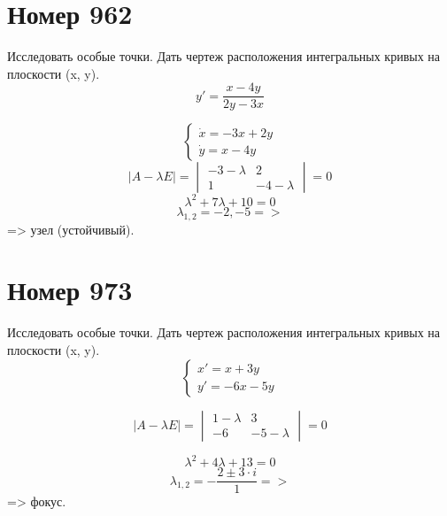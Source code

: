 \section*{Номер 962}
Исследовать особые точки. Дать чертеж расположения интегральных кривых на плоскости (x, y).
$$ y' = \dfrac{x - 4y}{2y - 3x} $$
\begin{solution}
    $$\begin{cases}
            \dot{x} = -3 x + 2 y \\
            \dot{y} = x - 4y
        \end{cases}$$
    $$ |A - \lambda E| = \begin{vmatrix}
            -3 - \lambda & 2             \\
            1            & - 4 - \lambda
        \end{vmatrix} = 0 $$
    $$ \lambda^2 + 7 \lambda + 10 = 0 $$
    $$\lambda_{1, 2} = -2, -5 =>$$
    => узел (устойчивый).
\end{solution}

\section*{Номер 973}
Исследовать особые точки. Дать чертеж расположения интегральных кривых на плоскости (x, y).
$$
    \begin{cases}
        x' = x + 3y \\
        y' = -6x - 5y
    \end{cases}
$$
\begin{solution}
    $$ |A - \lambda E| = \begin{vmatrix}
            1 - \lambda & 3           \\
            -6            & - 5 - \lambda 
        \end{vmatrix} = 0 $$

    $$ \lambda^2 + 4\lambda + 13 = 0 $$
    $$ \lambda_{1, 2} = -\dfrac{2 \pm 3 \cdot i}{1} => $$ => фокус.
\end{solution}\pagebreak